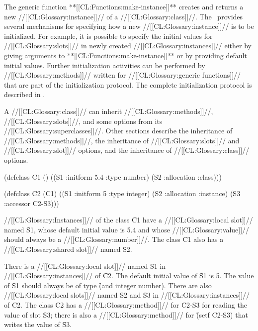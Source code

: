 \endsubSection%

\goodbreak

                      
The generic function **[[CL:Functions:make-instance]]** creates and returns a new
//[[CL:Glossary:instance]]// of a //[[CL:Glossary:class]]//.  
The \OS\ provides several mechanisms for
specifying how a new //[[CL:Glossary:instance]]// is to be initialized.  For example, it
is possible to specify the initial values for //[[CL:Glossary:slots]]// in newly created
//[[CL:Glossary:instances]]// 
either by giving arguments to **[[CL:Functions:make-instance]]** or by
providing default initial values.  Further initialization activities
can be performed by //[[CL:Glossary:methods]]// written for //[[CL:Glossary:generic functions]]// 
that are
part of the initialization protocol.  The complete initialization
protocol is described in \secref\ObjectCreationAndInit.

\endsubSection%

                                              
A //[[CL:Glossary:class]]// can inherit //[[CL:Glossary:methods]]//, //[[CL:Glossary:slots]]//, 
and some  options from its //[[CL:Glossary:superclasses]]//.  
Other sections describe the inheritance of //[[CL:Glossary:methods]]//, 
the inheritance of //[[CL:Glossary:slots]]// and //[[CL:Glossary:slot]]// options, 
and the inheritance of //[[CL:Glossary:class]]// options.
 


\code
 (defclass C1 () 
     ((S1 :initform 5.4 :type number) 
      (S2 :allocation :class)))
 
 (defclass C2 (C1) 
     ((S1 :initform 5 :type integer)
      (S2 :allocation :instance)
      (S3 :accessor C2-S3)))
\endcode

//[[CL:Glossary:Instances]]// of the class \f{C1} have a //[[CL:Glossary:local slot]]// named \f{S1},
whose default initial value is 5.4 and
whose //[[CL:Glossary:value]]// should always be a //[[CL:Glossary:number]]//.
The class \f{C1} also has a //[[CL:Glossary:shared slot]]// named \f{S2}.

There is a //[[CL:Glossary:local slot]]// named \f{S1} in //[[CL:Glossary:instances]]// of \f{C2}.
The default initial value of \f{S1} is 5.
The value of \f{S1} should always be of type \f{(and integer number)}.
There are also //[[CL:Glossary:local slots]]// named \f{S2} and \f{S3} in //[[CL:Glossary:instances]]// of \f{C2}.
The class \f{C2} has a //[[CL:Glossary:method]]// for \f{C2-S3} for reading the value of slot \f{S3};
there is also a //[[CL:Glossary:method]]// for \f{(setf C2-S3)} that writes the value of \f{S3}.

